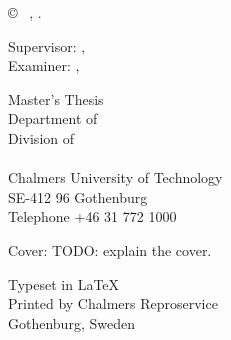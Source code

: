 \copyright ~ \MakeUppercase{\myname}, \the\year. \setlength{\parskip}{1cm}

Supervisor: \supervisorname, \department\\
Examiner: \examinername, \department \setlength{\parskip}{1cm}

Master's Thesis \the\year\\	
Department of \department\\
Division of \division\\
\researchgroup\\
Chalmers University of Technology\\
SE-412 96 Gothenburg\\
Telephone +46 31 772 1000 \setlength{\parskip}{0.5cm}

\vfill
Cover: TODO: explain the cover. \setlength{\parskip}{0.5cm}

Typeset in \LaTeX \tagtemp\\
Printed by Chalmers Reproservice\\
Gothenburg, Sweden \the\year
